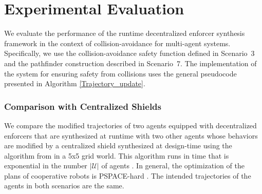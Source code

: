 \section{Experimental Evaluation}
We evaluate the performance of the runtime decentralized enforcer synthesis framework in the context of collision-avoidance for multi-agent systems. Specifically, we use the collision-avoidance safety function defined in Scenario~3 and the pathfinder construction described in Scenario~7. 
 The implementation of the system for ensuring safety from collisions uses the general pseudocode presented in Algorithm \ref{Trajectory_update}.
 
 

\subsubsection*{Comparison with Centralized Shields}

We compare the modified trajectories of two agents equipped with decentralized enforcers that are synthesized at runtime with two other agents whose behaviors are modified by a centralized shield synthesized at design-time using the algorithm from \cite{multiagentshield} in a 5x5 grid world. This algorithm runs in time that is exponential in the number  $|\mathcal{U}|$ of agents \cite{multiagentshield}. In general, the optimization of the plans of cooperative robots is PSPACE-hard \cite{hardness}.
The intended trajectories of the agents in both scenarios are the same. 

